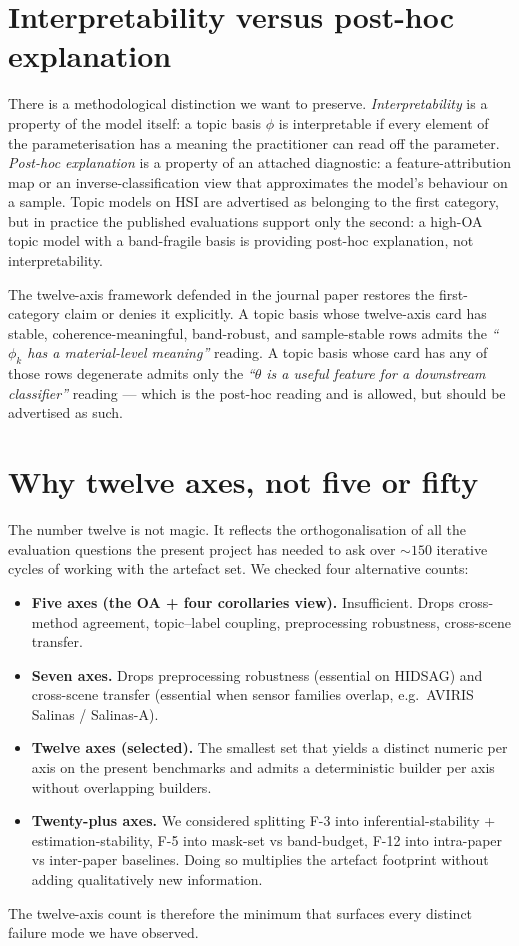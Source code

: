 \documentclass[11pt,a4paper]{article}
\begin{document}
\section{Interpretability versus post-hoc explanation}

There is a methodological distinction we want to preserve.
\emph{Interpretability} is a property of the model itself: a topic
basis $\phi$ is interpretable if every element of the
parameterisation has a meaning the practitioner can read off the
parameter. \emph{Post-hoc explanation} is a property of an attached
diagnostic: a feature-attribution map or an inverse-classification
view that approximates the model's behaviour on a sample. Topic
models on HSI are advertised as belonging to the first category, but
in practice the published evaluations support only the second:
a high-OA topic model with a band-fragile basis is providing
post-hoc explanation, not interpretability.

The twelve-axis framework defended in the journal paper restores the
first-category claim or denies it explicitly. A topic basis whose
twelve-axis card has stable, coherence-meaningful, band-robust, and
sample-stable rows admits the
\emph{``$\phi_k$ has a material-level meaning''} reading. A topic
basis whose card has any of those rows degenerate admits only the
\emph{``$\theta$ is a useful feature for a downstream classifier''}
reading --- which is the post-hoc reading and is allowed, but should
be advertised as such.

\section{Why twelve axes, not five or fifty}

The number twelve is not magic. It reflects the orthogonalisation
of all the evaluation questions the present project has needed to
ask over $\sim 150$ iterative cycles of working with the artefact
set. We checked four alternative counts:

\begin{itemize}
\item \textbf{Five axes (the OA + four corollaries view).}
Insufficient. Drops cross-method agreement, topic--label coupling,
preprocessing robustness, cross-scene transfer.
\item \textbf{Seven axes.} Drops preprocessing robustness (essential
on HIDSAG) and cross-scene transfer (essential when sensor families
overlap, e.g.\ AVIRIS Salinas / Salinas-A).
\item \textbf{Twelve axes (selected).} The smallest set that yields a
distinct numeric per axis on the present benchmarks and admits a
deterministic builder per axis without overlapping builders.
\item \textbf{Twenty-plus axes.} We considered splitting F-3 into
inferential-stability + estimation-stability, F-5 into mask-set vs
band-budget, F-12 into intra-paper vs inter-paper baselines. Doing so
multiplies the artefact footprint without adding qualitatively new
information.
\end{itemize}

The twelve-axis count is therefore the minimum that surfaces every
distinct failure mode we have observed.



\end{document}
